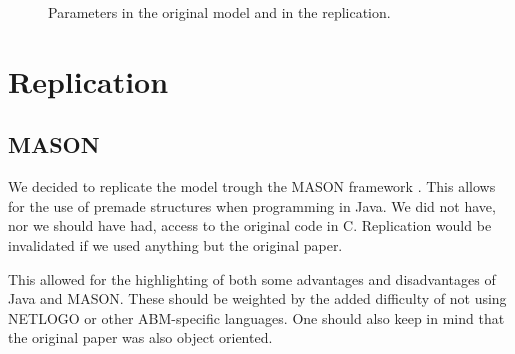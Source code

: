 \documentclass[runningheads,a4paper]{article}
\begin{document}
\begin{figure}
\centering
\caption{Parameters in the original model and in the replication.}
\label{fig:params}
\end{figure}

\section{Replication}

\subsection{MASON}
We decided to replicate the model trough the MASON framework \cite{luke2005mason}.
This allows for the use of premade structures when programming in Java.
We did not have, nor we should have had, access to the original code in C.
Replication would be invalidated if we used anything but the original paper.

This allowed for the highlighting of both some advantages and disadvantages of Java and MASON.
These should be weighted by the added difficulty of not using NETLOGO or other ABM-specific languages.
One should also keep in mind that the original paper was also object oriented.
\end{document}
